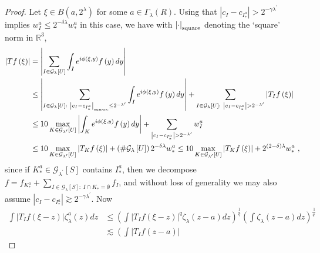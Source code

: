 \documentclass{amsart}%
\theoremstyle{plain}
\numberwithin{equation}{section}
\begin{document}
\begin{proof}
Let $\xi\in B\left(  a,2^{\lambda}\right)  $ for some $a\in\Gamma_{\lambda
}\left(  R\right)  $. Using that $\left\vert c_{I}-c_{I_{\ast}^{a}}\right\vert
>2^{-\gamma\lambda^{\prime}}$ implies $w_{I}^{a}\leq2^{-\delta\lambda}w_{\ast
}^{a}$ in this case, we have with $\left\vert \cdot\right\vert
_{\mathop{\rm square}}$ denoting the `square' norm in $\mathbb{R}^{3}$,
\begin{align*}
\left\vert Tf\left(  \xi\right)  \right\vert  &  =\left\vert \sum
_{I\in\mathcal{G}_{\lambda}\left[  U\right]  }\int_{I}e^{i\phi\left(
\xi,y\right)  }f\left(  y\right)  dy\right\vert \\
&  \leq\left\vert \sum_{I\in\mathcal{G}_{\lambda}\left[  U\right]
:\ \left\vert c_{I}-c_{I_{\ast}^{a}}\right\vert _{\mathop{\rm square}}%
\leq2^{-\lambda^{\prime}}}\int_{I}e^{i\phi\left(  \xi,y\right)  }f\left(
y\right)  dy\right\vert +\sum_{I\in\mathcal{G}_{\lambda}\left[  U\right]
:\ \left\vert c_{I}-c_{I_{\ast}^{a}}\right\vert >2^{-\lambda^{\prime}}%
}\left\vert T_{I}f\left(  \xi\right)  \right\vert \\
&  \leq10\max_{K\in\mathcal{G}_{\lambda^{\prime}}\left[  U\right]  }\left\vert
\int_{K}e^{i\phi\left(  \xi,y\right)  }f\left(  y\right)  dy\right\vert
+\sum_{\left\vert c_{I}-c_{I_{\ast}^{a}}\right\vert >2^{-\lambda^{\prime}}%
}w_{I}^{a}\\
&  \leq10\max_{K\in\mathcal{G}_{\lambda^{\prime}}\left[  U\right]  }\left\vert
T_{K}f\left(  \xi\right)  \right\vert +\left(  \#\mathcal{G}_{\lambda}\left[
U\right]  \right)  2^{-\delta\lambda}w_{\ast}^{a}\leq10\max_{K\in
\mathcal{G}_{\lambda^{\prime}}\left[  U\right]  }\left\vert T_{K}f\left(
\xi\right)  \right\vert +2^{\left(  2-\delta\right)  \lambda}w_{\ast}^{a}\ ,
\end{align*}
since if $K_{\ast}^{a}\in\mathcal{G}_{\lambda^{\prime}}\left[  S\right]  $
contains $I_{\ast}^{a}$, then we decompose $f=f_{K_{\ast}^{a}}+\sum
_{I\in\mathcal{G}_{\lambda}\left[  S\right]  :\ I\cap K_{\ast}=\emptyset}%
f_{I}$, and without loss of generality we may also assume $\left\vert
c_{I}-c_{I_{\ast}^{a}}\right\vert \gtrsim2^{-\gamma\lambda^{\prime}}$. Now
\begin{align*}
\int\left\vert T_{I}f\left(  \xi-z\right)  \right\vert \zeta_{\lambda}%
^{a}\left(  z\right)  dz  &  \leq\left(  \int\left\vert T_{I}f\left(
\xi-z\right)  \right\vert ^{q}\zeta_{\lambda}\left(  z-a\right)  dz\right)
^{\frac{1}{q}}\left(  \int\zeta_{\lambda}\left(  z-a\right)  dz\right)
^{\frac{1}{q^{\prime}}}\\
&  \lesssim\left(  \int\left\vert T_{I}f\left(  z-a\right)  \right\vert

\end{align*}
\end{proof}
\end{document}

